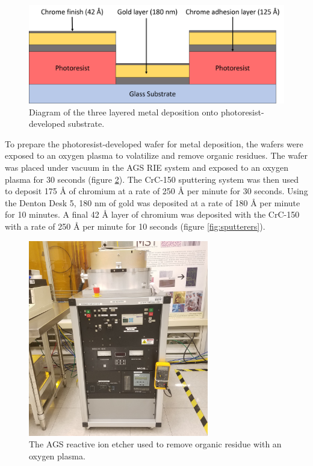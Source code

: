 \begin{figure}[h]
    \centering
    \includegraphics[width=\textwidth]{images/metal_deposition_diagram.png}
    \caption[Diagram of metal deposition onto photoresist-developed substrate]{Diagram of the three layered metal deposition onto photoresist-developed substrate.}
    \label{fig:metal_deposition}
\end{figure}

\par To prepare the photoresist-developed wafer for metal deposition, the wafers were exposed to an oxygen plasma to volatilize and remove organic residues. The wafer was placed under vacuum in the AGS RIE system and exposed to an oxygen plasma for 30 seconds (figure \ref{fig:AGS-RIE}). The CrC-150 sputtering system was then used to deposit 175 \si{\angstrom} of chromium at a rate of 250 \si{\angstrom} per minute for 30 seconds. Using the Denton Desk 5, 180 nm of gold was deposited at a rate of 180 \si{\angstrom} per minute for 10 minutes. A final 42 \si{\angstrom} layer of chromium was deposited with the CrC-150 with a rate of 250 \si{\angstrom} per minute for 10 seconds (figure \ref{fig:sputterers}). 

\begin{figure}
    \centering
    \includegraphics[width=0.7\textwidth]{images/AGS_RIE.jpg}
    \caption[AGS reactive ion etcher]{The AGS reactive ion etcher used to remove organic residue with an oxygen plasma.}
    \label{fig:AGS-RIE}
\end{figure}

